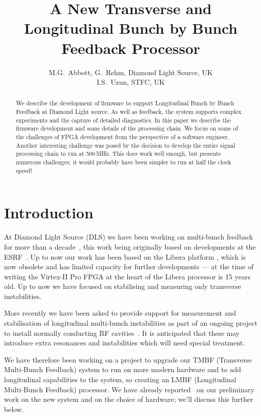 \documentclass[
    a4paper,
    keeplastbox,            %
    hyphens,                %
    nospread,               %
]{jacow}
\begin{document}
\title{A New Transverse and Longitudinal Bunch by Bunch Feedback Processor}
\author{
    M.G.~Abbott, G.~Rehm, Diamond Light Source, UK\\
    I.S.~Uzun, STFC, UK}
\maketitle

\begin{abstract}

We describe the development of firmware to support Longitudinal Bunch by Bunch
Feedback at Diamond Light source.  As well as feedback, the system supports
complex experiments and the capture of detailed diagnostics.  In this paper we
describe the firmware development and some details of the processing chain.  We
focus on some of the challenges of FPGA development from the perspective of a
software engineer.  Another interesting challenge was posed by the decision to
develop the entire signal processing chain to run at 500\,MHz.  This does work
well enough, but presents numerous challenges; it would probably have been
simpler to run at half the clock speed!

\end{abstract}


\section{Introduction}

At Diamond Light Source (DLS) we have been working on multi-bunch feedback for
more than a decade~\cite{dipac2007, epac2008, biw2010, icalepcs2011, ibic2013,
ibic2014, icalepcs2015}, this work being originally based on developments at the
ESRF~\cite{epac2006}.  Up to now our work has been based on the Libera platform
\cite{libera}, which is now obsolete and has limited capacity for further
developments --- at the time of writing the Virtex-II Pro FPGA at the heart of
the Libera processor is 15 years old.  Up to now we have focused on stabilising
and measuring only transverse instabilities.

More recently we have been asked to provide support for measurement and
stabilisation of longitudinal multi-bunch instabilities as part of an ongoing
project to install normally conducting RF cavities~\cite{ipac2017rf}.  It is
anticipated that these may introduce extra resonances and instabilities which
will need special treatment.

We have therefore been working on a project to upgrade our TMBF (Transverse
Multi-Bunch Feedback) system to run on more modern hardware and to add
longitudinal capabilities to the system, so creating an LMBF (Longitudinal
Multi-Bunch Feedback) processor.  We have already reported~\cite{ibic2016} on
our preliminary work on the new system and on the choice of hardware; we'll
discuss this further below.
\end{document}
